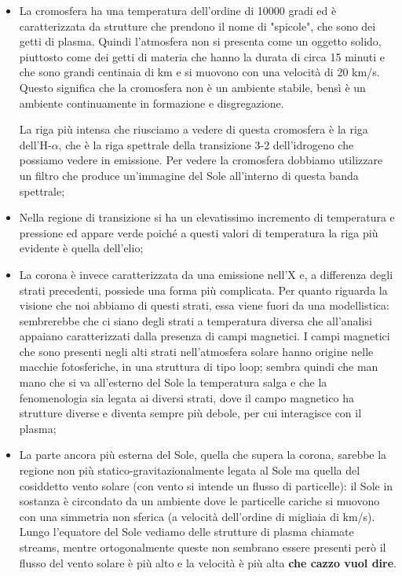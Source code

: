 \begin{itemize}
    \item La cromosfera ha una temperatura dell'ordine di 10000 gradi ed è caratterizzata da strutture che prendono il nome di "spicole", che sono dei getti di plasma. Quindi l'atmosfera non si presenta come un oggetto solido, piuttosto come dei getti di materia che hanno la durata di circa 15 minuti e che sono grandi centinaia di km e si muovono con una velocità di 20 km/s. Questo significa che la cromosfera non è un ambiente stabile, bensì è un ambiente continuamente in formazione e disgregazione.
    
    La riga più intensa che riusciamo a vedere di questa cromosfera è la riga dell'H-$\alpha$, che è la riga spettrale della transizione 3-2 dell'idrogeno che possiamo vedere in emissione. Per vedere la cromosfera dobbiamo utilizzare un filtro che produce un'immagine del Sole all'interno di questa banda spettrale;
    \item Nella regione di transizione si ha un elevatissimo incremento di temperatura e pressione ed appare verde poiché a questi valori di temperatura la riga più evidente è quella dell'elio;
    \item La corona è invece caratterizzata da una emissione nell'X e, a differenza degli strati precedenti, possiede una forma più complicata. Per quanto riguarda la visione che noi abbiamo di questi strati, essa viene fuori da una modellistica: sembrerebbe che ci siano degli strati a temperatura diversa che all'analisi appaiano caratterizzati dalla presenza di campi magnetici. I campi magnetici che sono presenti negli alti strati nell'atmosfera solare hanno origine nelle macchie fotosferiche, in una struttura di tipo loop; sembra quindi che man mano che si va all'esterno del Sole la temperatura salga e che la fenomenologia sia legata ai diversi strati, dove il campo magnetico ha strutture diverse e diventa sempre più debole, per cui interagisce con il plasma;
    \item La parte ancora più esterna del Sole, quella che supera la corona, sarebbe la regione non più statico-gravitazionalmente legata al Sole ma quella del cosiddetto vento solare (con vento si intende un flusso di particelle): il Sole in sostanza è circondato da un ambiente dove le particelle cariche si muovono con una simmetria non sferica (a velocità dell'ordine di migliaia di km/s). Lungo l'equatore del Sole vediamo delle strutture di plasma chiamate streams, mentre ortogonalmente queste non sembrano essere presenti però il flusso del vento solare è più alto e la velocità è più alta \textbf{che cazzo vuol dire}.
\end{itemize}

